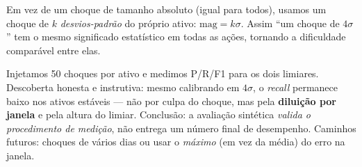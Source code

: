 \begin{definicao}
Em vez de um choque de tamanho absoluto (igual para todos), usamos um choque de
$k$ \emph{desvios-padrão} do próprio ativo: $\text{mag}=k\sigma$. Assim ``um
choque de $4\sigma$'' tem o mesmo significado estatístico em todas as ações,
tornando a dificuldade comparável entre elas.
\end{definicao}

\begin{naprat}
Injetamos 50 choques por ativo e medimos P/R/F1 para os dois limiares.
Descoberta honesta e instrutiva: mesmo calibrando em $4\sigma$, o \emph{recall}
permanece baixo nos ativos estáveis --- não por culpa do choque, mas pela
\textbf{diluição por janela} e pela altura do limiar. Conclusão: a avaliação
sintética \emph{valida o procedimento de medição}, não entrega um número final
de desempenho. Caminhos futuros: choques de vários dias ou usar o \emph{máximo}
(em vez da média) do erro na janela.
\end{naprat}
